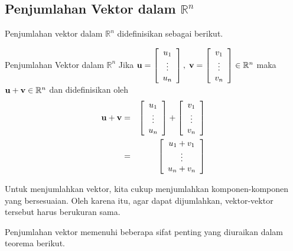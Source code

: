 \subsection{Penjumlahan Vektor dalam \texorpdfstring{$\mathbb{R}^n$}{Rn}}

Penjumlahan vektor dalam $\mathbb{R}^n$ didefinisikan sebagai berikut.  

\begin{definition}{Penjumlahan Vektor dalam $\mathbb{R}^n$}\label{def:vectoraddition}
Jika $\mathbf{u}=\left[ \begin{array}{c}
u_{1} \\
\vdots \\
u_{n}
\end{array}
\right],\; \mathbf{v}= \left[ \begin{array}{c}
v_{1} \\
\vdots \\
v_{n}
\end{array}
\right] \in \mathbb{R}^{n}$
maka $\mathbf{u}+\mathbf{v}\in \mathbb{R}^{n}$ dan didefinisikan oleh
\begin{eqnarray*}
\mathbf{u}+\mathbf{v} &=& \left[ \begin{array}{c}
u_{1} \\
\vdots \\
u_{n}
\end{array}
\right] +  \left[ \begin{array}{c}
v_{1} \\
\vdots \\
v_{n}
\end{array} \right]\\
& =& \left[ \begin{array}{c}
u_{1}+v_{1} \\
\vdots \\
u_{n}+v_{n}
\end{array}
\right]
\end{eqnarray*}
\end{definition}

Untuk menjumlahkan vektor, kita cukup menjumlahkan komponen-komponen yang bersesuaian. Oleh karena itu, agar dapat dijumlahkan, vektor-vektor tersebut harus
berukuran sama.

Penjumlahan vektor memenuhi beberapa sifat penting yang diuraikan dalam teorema berikut.


